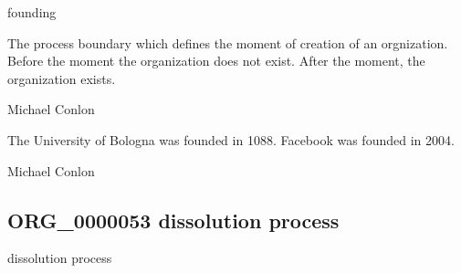 \documentclass[letterpaper,10pt,english]{sphinxmanual}
\begin{document}
\begin{sphinxShadowBox}

\sphinxAtStartPar
founding
\end{sphinxShadowBox}

\begin{sphinxShadowBox}

\sphinxAtStartPar
The process boundary which defines the moment of creation of an orgnization.  Before the moment  the organization does not exist.  After the moment, the organization exists.
\end{sphinxShadowBox}

\begin{sphinxShadowBox}

\sphinxAtStartPar
Michael Conlon 
\end{sphinxShadowBox}

\begin{sphinxShadowBox}

\sphinxAtStartPar
The University of Bologna was founded in 1088.  Facebook was founded in 2004.
\end{sphinxShadowBox}

\begin{sphinxShadowBox}

\sphinxAtStartPar
Michael Conlon 
\end{sphinxShadowBox}
\begin{quote}

\ignorespaces \end{quote}


\subsection{ORG\_0000053 \sphinxhyphen{} dissolution process}
\label{\detokenize{doc-ORG_0000053:org-0000053-dissolution-process}}\label{\detokenize{doc-ORG_0000053:index-0}}\label{\detokenize{doc-ORG_0000053::doc}}
\begin{sphinxShadowBox}

\sphinxAtStartPar
dissolution process
\end{sphinxShadowBox}
\end{document}

